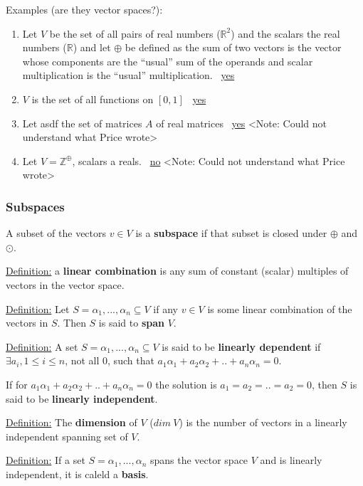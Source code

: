 Examples (are they vector spaces?):

\begin{enumerate}
  \item Let $V$ be the set of all pairs of real numbers ($\mathbb{R} ^ 2$) and the scalars the real numbers ($\mathbb{R}$) and let $\oplus$ be defined as the sum of two vectors is the vector whose components are the ``usual'' sum of the operands and scalar multiplication is the ``usual'' multiplication. \textrightarrow\ \underline{yes}

  \item $V$ is the set of all functions on $[0,1]$ \textrightarrow\ \underline{yes}

  \item Let asdf the set of matrices $A$ of real matrices \textrightarrow\ \underline{yes} <Note: Could not understand what Price wrote>

  \item Let $V = \mathbb{Z}^\oplus$, scalars a reals. \textrightarrow\ \underline{no} <Note: Could not understand what Price wrote>
\end{enumerate}


\subsubsection{Subspaces}

A subset of the vectors $v \in V$ is a \textbf{subspace} if that subset is closed under $\oplus$ and $\odot$.

\underline{Definition:} a \textbf{linear combination} is any sum of constant (scalar) multiples of vectors in the vector space.

\underline{Definition:} Let $S = {\alpha_1, ..., \alpha_n} \subseteq V$ if any $v \in V$ is some linear combination of the vectors in $S$. Then $S$ is said to \textbf{span} $V$.

\underline{Definition:} A set $S = {\alpha_1, ..., \alpha_n} \subseteq V$ is said to be \textbf{linearly dependent} if $\exists a_i, 1 \leq i \leq n$, not all 0, such that $a_1 \alpha_1 + a_2 \alpha_2 + .. + a_n \alpha_n = 0$.

If for $a_1 \alpha_1 + a_2 \alpha_2 + .. + a_n \alpha_n = 0$ the solution is $a_1 = a_2 = .. = a_2 = 0$, then $S$ is said to be \textbf{linearly independent}.

\underline{Definition:} The \textbf{dimension} of $V$ ($dim\ V$) is the number of vectors in a  linearly independent spanning set of $V$.

\underline{Definition:} If a set $S = {\alpha_1, ..., \alpha_n}$ spans the vector space $V$ and is linearly independent, it is caleld a \textbf{basis}.